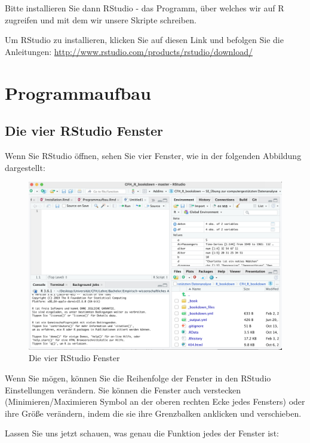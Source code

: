 \documentclass[
]{book}
\begin{document}
Bitte installieren Sie dann RStudio - das Programm, über welches wir auf R zugreifen und mit dem wir unsere Skripte schreiben.

Um RStudio zu installieren, klicken Sie auf diesen Link und befolgen Sie die Anleitungen: \url{http://www.rstudio.com/products/rstudio/download/}

\hypertarget{programmaufbau}{%
\chapter{Programmaufbau}\label{programmaufbau}}

\hypertarget{die-vier-rstudio-fenster}{%
\section{Die vier RStudio Fenster}\label{die-vier-rstudio-fenster}}

Wenn Sie RStudio öffnen, sehen Sie vier Fenster, wie in der folgenden Abbildung dargestellt:

\begin{figure}
\includegraphics[width=28.08in]{images/windows} \caption{Die vier RStudio Fenster}\label{fig:unnamed-chunk-1}
\end{figure}

Wenn Sie mögen, können Sie die Reihenfolge der Fenster in den RStudio Einstellungen verändern.
Sie können die Fenster auch verstecken (Minimieren/Maximieren Symbol an der oberen rechten Ecke jedes Fensters) oder ihre Größe verändern, indem die sie ihre Grenzbalken anklicken und verschieben.

Lassen Sie uns jetzt schauen, was genau die Funktion jedes der Fenster ist:
\end{document}
